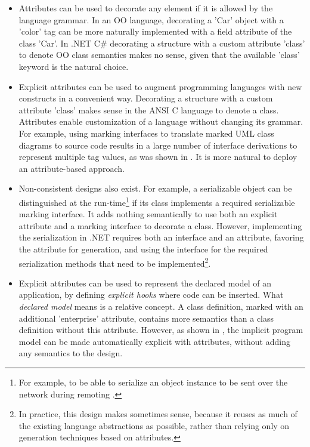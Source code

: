 \begin{itemize}
\item Attributes can be used to decorate any element if it is allowed by the language grammar. In an OO language, decorating a 'Car' object with a 'color' tag can be more naturally implemented with a field attribute of the class 'Car'. In .NET C\# \cite{www.dotnet} decorating a structure with a custom attribute 'class' to denote OO class semantics makes no sense, given that the available 'class' keyword is the natural choice.

\item Explicit attributes can be used to augment programming languages with new constructs in a convenient way. Decorating a structure with a custom attribute 'class' makes sense in the ANSI C language to denote a class. Attributes enable customization  of a language without changing its grammar. For example, using marking interfaces to translate marked UML class diagrams to source code results in a large number of interface derivations to represent multiple tag values, as was shown in . It is more natural to deploy an attribute-based approach.

\item Non-consistent designs also exist. For example, a serializable object can be distinguished at the run-time\footnote{For example, to be able to serialize an object instance to be sent over the network during remoting \cite{dnet.remoting}.} if its class implements a required serializable marking interface. It adds nothing semantically to use both an explicit attribute and a marking interface \cite{design.attrib} to decorate a class.
%
However, implementing the serialization in .NET requires both an interface and an attribute, favoring the attribute for generation, and using the interface for the required serialization methods that need to be implemented\footnote{In practice, this design makes sometimes sense, because it reuses as much of the existing language abstractions as possible, rather than relying only on generation techniques based on attributes.}.

\item Explicit attributes can be used to represent the declared model of an application, by defining \textit{explicit hooks} \cite{java.compost} where code can be inserted. What \textit{declared model} means is a relative concept. A class definition, marked with an additional 'enterprise' attribute, contains more semantics than a class definition without this attribute. However, as shown in , the implicit program model can be made automatically explicit with attributes, without adding any semantics to the design.


\end{itemize}
